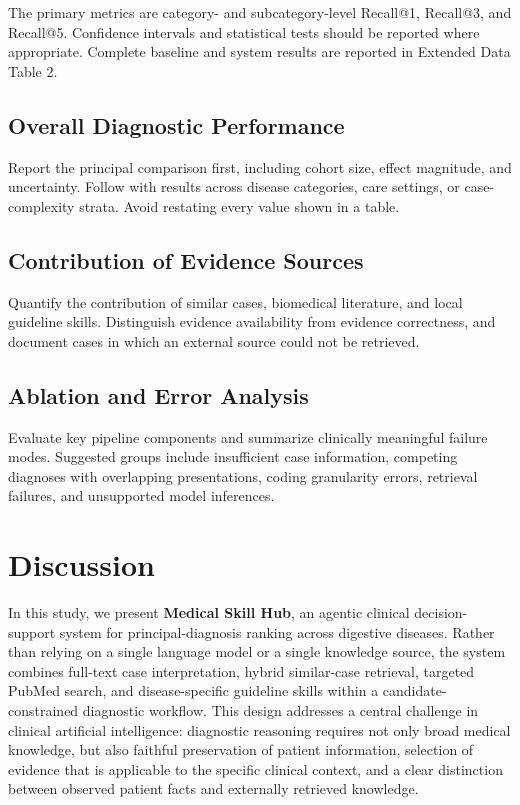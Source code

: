 \documentclass[10pt,letterpaper]{article}
\newcommand{\systemname}{\textbf{Medical Skill Hub}}
\begin{document}
The primary metrics are category- and subcategory-level Recall@1, Recall@3, and
Recall@5. Confidence intervals and statistical tests should be reported where
appropriate. Complete baseline and system results are reported in Extended Data
Table 2.

\subsection{Overall Diagnostic Performance}

Report the principal comparison first, including cohort size, effect magnitude,
and uncertainty. Follow with results across disease categories, care settings,
or case-complexity strata. Avoid restating every value shown in a table.

\subsection{Contribution of Evidence Sources}

Quantify the contribution of similar cases, biomedical literature, and local
guideline skills. Distinguish evidence availability from evidence correctness,
and document cases in which an external source could not be retrieved.

\subsection{Ablation and Error Analysis}

Evaluate key pipeline components and summarize clinically meaningful failure
modes. Suggested groups include insufficient case information, competing
diagnoses with overlapping presentations, coding granularity errors, retrieval
failures, and unsupported model inferences.

\section{Discussion}

In this study, we present \systemname{}, an agentic clinical decision-support
system for principal-diagnosis ranking across digestive diseases. Rather than
relying on a single language model or a single knowledge source, the system
combines full-text case interpretation, hybrid similar-case retrieval, targeted
PubMed search, and disease-specific guideline skills within a candidate-
constrained diagnostic workflow. This design addresses a central challenge in
clinical artificial intelligence: diagnostic reasoning requires not only broad
medical knowledge, but also faithful preservation of patient information,
selection of evidence that is applicable to the specific clinical context, and
a clear distinction between observed patient facts and externally retrieved
knowledge.
\end{document}
